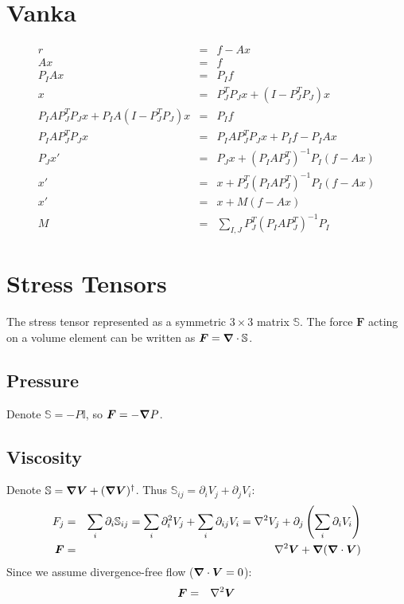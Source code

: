 \documentclass[11pt]{article}
\begin{document}
\section{Vanka}
\begin{eqnarray}
 r &=& f - Ax \\
 Ax &=& f \\
 P_I A x &=& P_I f \\
 x &=& P_J^T P_J x + (I - P_J^T P_J) x \\
 P_I A P_J^T P_J x + P_I A  (I - P_J^T P_J) x &=& P_I f \\
 P_I A P_J^T P_J x &=& P_I A  P_J^T P_J x + P_I f - P_I A x \\
 P_J x' &=& P_J x + (P_I A P_J^T)^{-1} P_I (f - Ax) \\
 x' &=& x + P_J^T (P_I A P_J^T)^{-1} P_I (f - Ax) \\
 x' &=& x + M (f - Ax) \\
 M &=& \sum_{I,J} P_J^T (P_I A P_J^T)^{-1} P_I
\end{eqnarray}

\section{Stress Tensors}
The stress tensor represented as a symmetric $3 \times 3$ matrix $\mathbb{S}$.
The force $\boldsymbol{F}$ acting on a volume element can be written as $\boldsymbol{F} = \boldsymbol{\nabla} \cdot \mathbb{S}$.

\subsection{Pressure}
Denote $\mathbb{S} = -P \mathbb{I}$, so $\boldsymbol{F} = -\boldsymbol{\nabla} P$.

\subsection{Viscosity}
Denote $\mathbb{S} = \boldsymbol{\nabla} \boldsymbol{V} + (\boldsymbol{\nabla} \boldsymbol{V})^\dagger$.
Thus $\mathbb{S}_{ij} = \partial_i V_j + \partial_j V_i$:
\begin{eqnarray}
F_j &=& \sum_i \partial_i \mathbb{S}_{ij} = \sum_i \partial^2_i V_j + \sum_i \partial_{ij} V_i
= \nabla^2 V_j + \partial_j \left(\sum_i \partial_i V_i\right) \\
\boldsymbol{F} &=& \nabla^2 \boldsymbol{V} + \boldsymbol{\nabla} (\boldsymbol{\nabla} \cdot \boldsymbol{V})
\end{eqnarray}
Since we assume divergence-free flow ($\boldsymbol{\nabla} \cdot \boldsymbol{V} = 0$):
\begin{eqnarray}
\boldsymbol{F} &=& \nabla^2 \boldsymbol{V}
\end{eqnarray}
\end{document}

